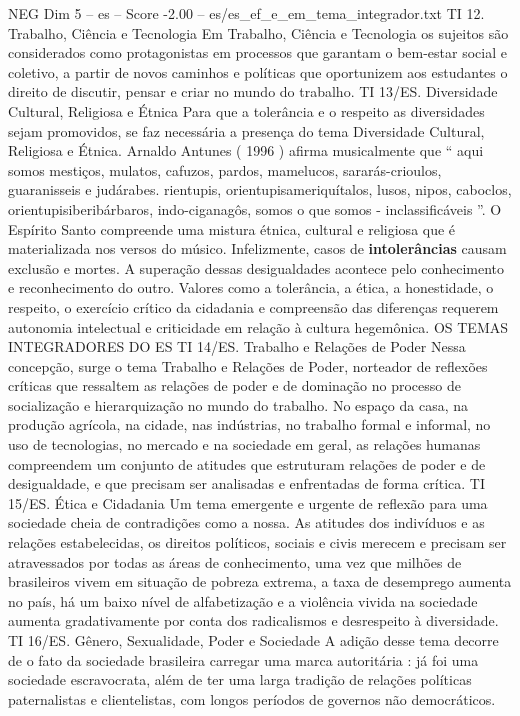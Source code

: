 \begin{textsample}{NEG Dim 5 – es – Score -2.00 – es/es\_ef\_e\_em\_tema\_integrador.txt}
TI 12.
Trabalho, Ciência e Tecnologia Em Trabalho, Ciência e Tecnologia os sujeitos são considerados como protagonistas em processos que garantam o bem-estar social e coletivo, a partir de novos caminhos e políticas que oportunizem aos estudantes o direito de discutir, pensar e criar no mundo do trabalho.
TI 13/ES.
Diversidade Cultural, Religiosa e Étnica Para que a tolerância e o respeito as diversidades sejam promovidos, se faz necessária a presença do tema Diversidade Cultural, Religiosa e Étnica.
Arnaldo Antunes ( 1996 ) afirma musicalmente que “ aqui somos mestiços, mulatos, cafuzos, pardos, mamelucos, sararás-crioulos, guaranisseis e judárabes. rientupis, orientupisameriquítalos, lusos, nipos, caboclos, orientupisiberibárbaros, indo-ciganagôs, somos o que somos - inclassificáveis ”.
O Espírito Santo compreende uma mistura étnica, cultural e religiosa que é materializada nos versos do músico.
Infelizmente, casos de \textbf{intolerâncias} causam exclusão e mortes.
A superação dessas desigualdades acontece pelo conhecimento e reconhecimento do outro.
Valores como a tolerância, a ética, a honestidade, o respeito, o exercício crítico da cidadania e compreensão das diferenças requerem autonomia intelectual e criticidade em relação à cultura hegemônica.
OS TEMAS INTEGRADORES DO ES TI 14/ES.
Trabalho e Relações de Poder Nessa concepção, surge o tema Trabalho e Relações de Poder, norteador de reflexões críticas que ressaltem as relações de poder e de dominação no processo de socialização e hierarquização no mundo do trabalho.
No espaço da casa, na produção agrícola, na cidade, nas indústrias, no trabalho formal e informal, no uso de tecnologias, no mercado e na sociedade em geral, as relações humanas compreendem um conjunto de atitudes que estruturam relações de poder e de desigualdade, e que precisam ser analisadas e enfrentadas de forma crítica.
TI 15/ES.
Ética e Cidadania Um tema emergente e urgente de reflexão para uma sociedade cheia de contradições como a nossa.
As atitudes dos indivíduos e as relações estabelecidas, os direitos políticos, sociais e civis merecem e precisam ser atravessados por todas as áreas de conhecimento, uma vez que milhões de brasileiros vivem em situação de pobreza extrema, a taxa de desemprego aumenta no país, há um baixo nível de alfabetização e a violência vivida na sociedade aumenta gradativamente por conta dos radicalismos e desrespeito à diversidade.
TI 16/ES.
Gênero, Sexualidade, Poder e Sociedade A adição desse tema decorre de o fato da sociedade brasileira carregar uma marca autoritária : já foi uma sociedade escravocrata, além de ter uma larga tradição de relações políticas paternalistas e clientelistas, com longos períodos de governos não democráticos.

\end{textsample}
